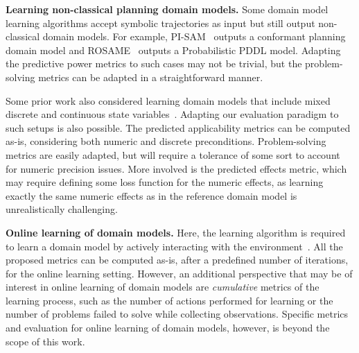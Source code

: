 \documentclass{article}
\newcommand{\miniparagraph}[1]{\textbf{#1.}}
\theoremstyle{definition}
\theoremstyle{remark}
\newif\ifaddcomments
\newcommand{\roni}[1]{\ifaddcomments{\textcolor{red}{[Roni: #1]}}\fi}
\newcommand{\brendan}[1]{\ifaddcomments{\textcolor{brown}{[Brendan: {#1}]}}\fi}
\begin{document}
\miniparagraph{Learning non-classical planning domain models}
Some domain model learning algorithms accept symbolic trajectories as input but still output non-classical domain models. For example, PI-SAM~\citep{le2024learning} outputs a conformant planning domain model and ROSAME~\citep{xi2024neuro} outputs a Probabilistic PDDL model. \roni{I vaguely remember some other work that does this, maybe}
Adapting the predictive power metrics to such cases may not be trivial, but the problem-solving metrics can be adapted in a straightforward manner. 


Some prior work also considered learning domain models that include mixed discrete and continuous state variables~\citep{segura2021discovering,mordoch2023learning}. 
Adapting our evaluation paradigm to such setups is also possible. 
The predicted applicability metrics can be computed as-is, considering both numeric and discrete preconditions.
Problem-solving metrics are easily adapted, but will require a tolerance of some sort to account for numeric precision issues. 
More involved is the predicted effects metric, which may require defining some loss function for the numeric effects, as learning exactly the same numeric effects as in the reference domain model is unrealistically challenging. 




\miniparagraph{Online learning of domain models}
Here, the learning algorithm is required to learn a domain model by actively interacting with the environment~\citep{lamanna2021online, sreedharan2023optimistic, benyamin2025integratingreinforcementlearningaction, ng2019incremental, chitnis2021glib, jin2022creativity, verma2023autonomous, karia2023epistemic}. 
All the proposed metrics can be computed as-is, after a predefined number of iterations, for the online learning setting. 
However, an additional perspective that may be of interest in online learning of domain models are \emph{cumulative} metrics of the learning process, such as the number of actions performed for learning or the number of problems failed to solve while collecting observations.
Specific metrics and evaluation for online learning of domain models, however, is beyond the scope of this work. 
\end{document}
